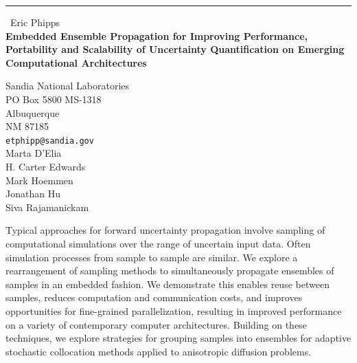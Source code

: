 \documentclass{report}
\begin{document}
\begin{center}
\rule{6in}{1pt} \
{\large Eric Phipps \\
{\bf Embedded Ensemble Propagation for Improving Performance, Portability and Scalability of Uncertainty Quantification on Emerging Computational Architectures}}

Sandia National Laboratories \\ PO Box 5800 MS-1318 \\ Albuquerque \\ NM 87185
\\
{\tt etphipp@sandia.gov}\\
Marta D'Elia\\
H. Carter Edwards\\
Mark Hoemmen\\
Jonathan Hu\\
Siva Rajamanickam\end{center}

Typical approaches for forward uncertainty propagation involve sampling
of computational simulations over the range of uncertain input data.
Often simulation processes from sample to sample are similar. We explore
a rearrangement of sampling methods to simultaneously propagate ensembles
of samples in an embedded fashion. We demonstrate this enables reuse
between samples, reduces computation and communication costs, and
improves opportunities for fine-grained parallelization, resulting in
improved performance on a variety of contemporary computer architectures.
Building on these techniques, we explore strategies for grouping samples
into ensembles for adaptive stochastic collocation methods applied to
anisotropic diffusion problems.
\end{document}
